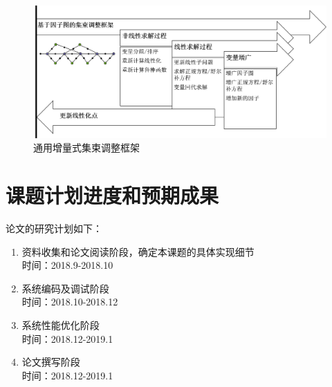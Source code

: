 \documentclass[oneside]{ZJUthesis}
\begin{document}
\begin{figure}[htb!]
    \centering
    \includegraphics[scale=.5]{Pictures/framework.png}
    \caption{通用增量式集束调整框架}
    \label{fig:pipeline}
\end{figure}

\chapter{课题计划进度和预期成果}

论文的研究计划如下：
\begin{enumerate}
    \item
    资料收集和论文阅读阶段，确定本课题的具体实现细节 \\
    时间：2018.9-2018.10
    \item
    系统编码及调试阶段 \\
    时间：2018.10-2018.12
    \item
    系统性能优化阶段 \\
    时间：2018.12-2019.1
    \item
    论文撰写阶段 \\
    时间：2018.12-2019.1
\end{enumerate}

\ZJUbackmatter
{}
\end{document}

